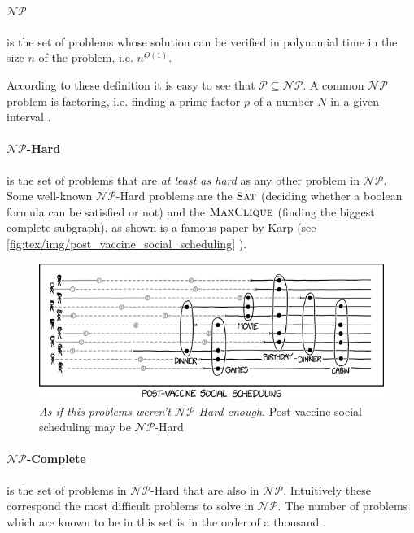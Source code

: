 \paragraph{$\mathcal{NP} $}%
\label{par:np} is the set of problems whose solution can be verified in
polynomial time in the size $n$ of the problem, i.e. $n^{O(1)} $.

According to these definition it is easy to see that $\mathcal{P} \subseteq
	\mathcal{NP} $. A common $\mathcal{NP} $ problem is factoring, i.e. finding a
prime factor $p$ of a number $N$ in a given interval \cite{SanjeevArora2017}.

\paragraph{$\mathcal{NP} $-Hard}%
\label{par:_np_hard} is the set of problems that are \emph{at least as hard} as
any other problem in $\mathcal{NP} $. Some well-known $\mathcal{NP} $-Hard
problems are the $\textsc{Sat}$ (deciding whether a boolean formula can be
satisfied or not) and the $\textsc{MaxClique}$ (finding the biggest complete
subgraph), as shown is a famous paper by Karp \cite{Miller1972} (see
\autoref{fig:tex/img/post_vaccine_social_scheduling} ).

\begin{figure}[]
	\centering
	\includegraphics[width=0.8\linewidth]{tex/img/post_vaccine_social_scheduling.png}
	\caption{\emph{As if this problems weren't $\mathcal{NP} $-Hard enough}.
		Post-vaccine social scheduling may be $\mathcal{NP} $-Hard \cite{Munroe}}%
	\label{fig:tex/img/post_vaccine_social_scheduling}
\end{figure}

\paragraph{$\mathcal{NP} $-Complete}%
\label{par:_np_hard} is the set of problems in $\mathcal{NP} $-Hard that are
also in $\mathcal{NP} $. Intuitively these correspond the most difficult
problems to solve in $\mathcal{NP} $. The number of problems which are known to
be in this set is in the order of a thousand \cite{SanjeevArora2017}.

